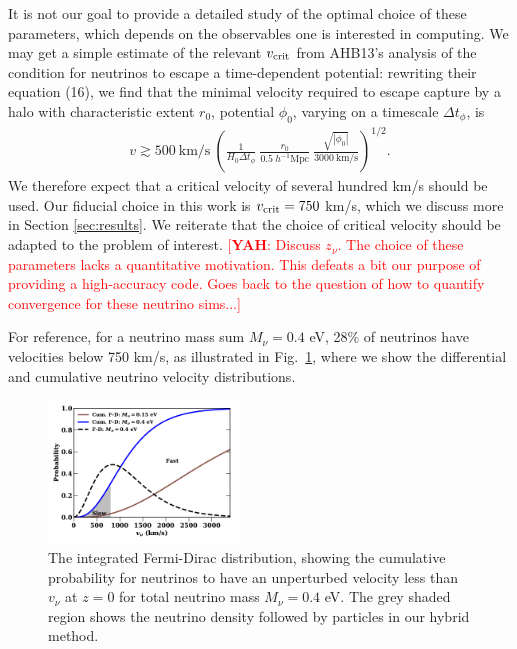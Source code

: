 \documentclass[useAMS, usenatbib]{mnras}
\newcommand{\barr}{\begin{eqnarray}}
\newcommand{\earr}{\end{eqnarray}}
\newcommand{\yah}[1]{{\textcolor{red}{[{\bf YAH}: #1]}}}
\begin{document}
It is not our goal to provide a detailed study of the optimal choice of these parameters, which depends on the observables one is interested in computing. We may get a simple estimate of the relevant $v_{\rm crit}$ from AHB13's analysis of the condition for neutrinos to escape a time-dependent potential: rewriting their equation (16), we find that the minimal velocity required to escape capture by a halo with characteristic extent $r_0$, potential $\phi_0$, varying on a timescale $\Delta t_\phi$, is
\barr
v \gtrsim 500 ~\textrm{km/s} ~ \left(\frac1{H_0 \Delta t_\phi} ~ \frac{r_0}{0.5~ h^{-1} \textrm{Mpc}}~ \frac{\sqrt{|\phi_0|}}{3000~ \textrm{km/s}} \right)^{1/2}.
\earr
We therefore expect that a critical velocity of several hundred km/s should be used. Our fiducial choice in this work is $v_{\rm crit} = 750$ km/s, which we discuss more in Section \ref{sec:results}. We reiterate that the choice of critical velocity should be adapted to the problem of interest.
\yah{Discuss $z_\nu$. The choice of these parameters lacks a quantitative motivation. This defeats a bit our purpose of providing a high-accuracy code. Goes back to the question of how to quantify convergence for these neutrino sims...}

For reference, for a neutrino mass sum $M_\nu = 0.4$ eV, 28\% of neutrinos have velocities below 750 km/s, as illustrated in Fig.~\ref{fig:fddistribution}, where we show the differential and cumulative neutrino velocity distributions.

\begin{figure}
\includegraphics[width=0.45\textwidth]{nuplots/fermidirac.pdf}
  \caption{The integrated Fermi-Dirac distribution, showing the cumulative probability for neutrinos to have an unperturbed velocity less than $v_\nu$ at $z=0$ for total neutrino mass $M_\nu = 0.4$ eV.
  The grey shaded region shows the neutrino density followed by particles in our hybrid method.
  }
  \label{fig:fddistribution}
\end{figure}
\end{document}
